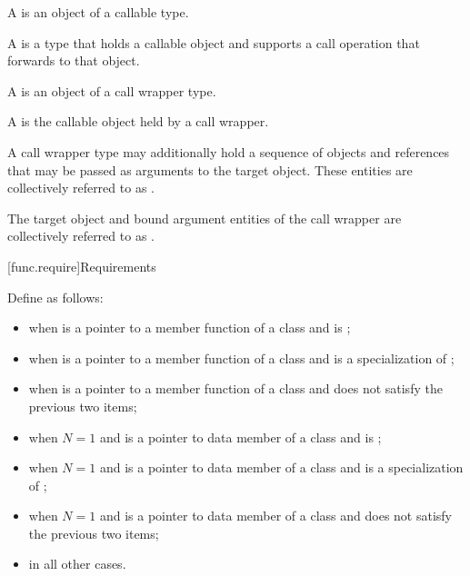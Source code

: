 \pnum
A  is an object of a callable type.

\pnum
A  is a type that holds a callable object
and supports a call operation that forwards to that object.

\pnum
A  is an object of a call wrapper type.

\pnum
A  is the callable object held by a call wrapper.

\pnum
A call wrapper type may additionally hold
a sequence of objects and references
that may be passed as arguments to the target object.
These entities are collectively referred to
as .

\pnum
The target object and bound argument entities of the call wrapper are
collectively referred to as .

[func.require]{Requirements}

\pnum
{}%
%
Define  as follows:
\begin{itemize}
\item {} when  is a pointer to a
member function of a class 
and
 is ;

\item {} when  is a pointer to a
member function of a class 
and  is a specialization of ;

\item {} when  is a pointer to a
member function of a class 
and  does not satisfy the previous two items;

\item {} when $N = 1$ and  is a pointer to
data member of a class 
and
 is ;

\item {} when $N = 1$ and  is a pointer to
data member of a class 
and  is a specialization of ;

\item {} when $N = 1$ and  is a pointer to
data member of a class 
and  does not satisfy the previous two items;

\item {} in all other cases.
\end{itemize}

